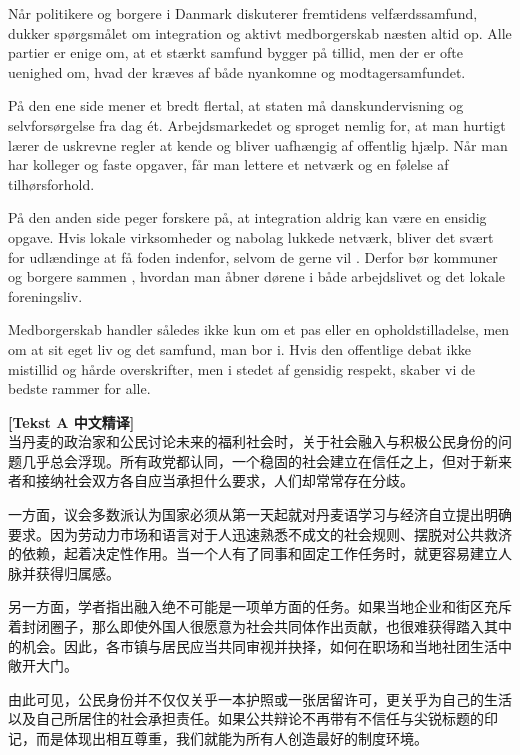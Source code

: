 Når politikere og borgere i Danmark diskuterer fremtidens velfærdssamfund, dukker spørgsmålet om integration og aktivt medborgerskab næsten altid op. Alle partier er enige om, at et stærkt samfund bygger på tillid, men der er ofte uenighed om, hvad der kræves af både nyankomne og modtagersamfundet.

På den ene side mener et bredt flertal, at staten må  danskundervisning og selvforsørgelse fra dag ét. Arbejdsmarkedet og sproget  nemlig  for, at man hurtigt lærer de uskrevne regler at kende og bliver uafhængig af offentlig hjælp. Når man har kolleger og faste opgaver, får man lettere et netværk og en følelse af tilhørsforhold.

På den anden side peger forskere på, at integration aldrig kan være en ensidig opgave. Hvis lokale virksomheder og nabolag  lukkede netværk, bliver det svært for udlændinge at få foden indenfor, selvom de gerne vil . Derfor bør kommuner og borgere sammen , hvordan man åbner dørene i både arbejdslivet og det lokale foreningsliv.

Medborgerskab handler således ikke kun om et pas eller en opholdstilladelse, men om at  sit eget liv og det samfund, man bor i. Hvis den offentlige debat ikke  mistillid og hårde overskrifter, men i stedet af gensidig respekt, skaber vi de bedste rammer for alle.

\begin{transbox}
\small
\textbf{\color{NCDTeal}[Tekst A 中文精译]}\\
当丹麦的政治家和公民讨论未来的福利社会时，关于社会融入与积极公民身份的问题几乎总会浮现。所有政党都认同，一个稳固的社会建立在信任之上，但对于新来者和接纳社会双方各自应当承担什么要求，人们却常常存在分歧。

一方面，议会多数派认为国家必须从第一天起就对丹麦语学习与经济自立提出明确要求。因为劳动力市场和语言对于人迅速熟悉不成文的社会规则、摆脱对公共救济的依赖，起着决定性作用。当一个人有了同事和固定工作任务时，就更容易建立人脉并获得归属感。

另一方面，学者指出融入绝不可能是一项单方面的任务。如果当地企业和街区充斥着封闭圈子，那么即使外国人很愿意为社会共同体作出贡献，也很难获得踏入其中的机会。因此，各市镇与居民应当共同审视并抉择，如何在职场和当地社团生活中敞开大门。

由此可见，公民身份并不仅仅关乎一本护照或一张居留许可，更关乎为自己的生活以及自己所居住的社会承担责任。如果公共辩论不再带有不信任与尖锐标题的印记，而是体现出相互尊重，我们就能为所有人创造最好的制度环境。
\end{transbox}

